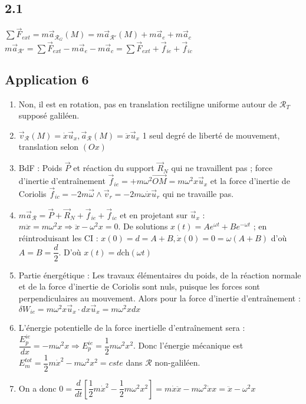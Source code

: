\documentclass[a4paper,12pt]{book}
\begin{document}
\subsection{2.1}
$\sum \vec{F}_{ext} = m\vec{a}_{\mathcal{R}_G}(M) = m\vec{a}_{\mathcal{R}'}(M) + m\vec{a}_e + m\vec{a}_c$
\\ $m\vec{a}_{\mathcal{R}'} = \sum \vec{F}_{ext} - m\vec{a}_e - m\vec{a}_c = \sum \vec{F}_{ext} + \vec{f}_{ie} + \vec{f}_{ic}$
 
\subsection{Application 6}
\begin{enumerate}
\item Non, il est en rotation, pas en translation rectiligne uniforme autour de $\mathcal{R}_T$ supposé galiléen.
\item $\vec{v}_\mathcal{R}(M) = \dot{x}\vec{u}_x, \vec{a}_\mathcal{R}(M) = \ddot{x}\vec{u}_x$ 1 seul degré de liberté de mouvement, translation selon $(Ox)$
\item BdF : Poids $\vec{P}$ et réaction du support $\vec{R}_N$ qui ne travaillent pas ; force d'inertie d'entraînement $\vec{f}_{ie} = +m\omega^2\vec{OM} = m\omega^2x\vec{u}_x$ et la force d'inertie de Coriolis $\vec{f}_{ic} = -2m\vec{\omega}\wedge\vec{v}_r = -2m\omega\dot{x}\vec{u}_r$ qui ne travaille pas.
\item $m\vec{a}_\mathcal{R} = \vec{P} +\vec{R}_N +\vec{f}_{ie} +\vec{f}_{ic}$ et en projetant sur $\vec{u}_x$ : $m\ddot{x} = m\omega^2 x \Rightarrow \ddot{x} -\omega^2 x=0$. De solutions $x(t) = Ae^{\omega t} + Be^{-\omega t}$ ; en réintroduisant les CI : $x(0) = d = A+B,\dot{x}(0) = 0= \omega(A+B)$ d'où $A=B=\dfrac{d}{2}$. D'où $x(t) = d\mathrm{ch}(\omega t)$
\item Partie énergétique : Les travaux élémentaires du poids, de la réaction normale et de la force d'inertie de Coriolis sont nuls, puisque les forces sont perpendiculaires au mouvement. Alors pour la force d'inertie d'entraînement : $\delta W_{ie} = m\omega^2 x\vec{u}_{x}\cdot dx\vec{u}_x = m\omega^2xdx$
\item L'énergie potentielle de la force inertielle d'entraînement sera : $\dfrac{E_p^{ie}}{dx} = -m\omega^2x \Rightarrow E_p^{ie} = \dfrac{1}{2}m\omega^2x^2$. Donc l'énergie mécanique est $E_m^{tot} = \dfrac{1}{2}m\dot{x}^2 -m\omega^2x^2 = cste$ dans $\mathcal{R}$ non-galiléen.
\item On a donc $0 = \dfrac{d}{dt}\left[\dfrac{1}{2}m\dot{x}^2 -\dfrac{1}{2}m\omega^2x^2\right] = m\dot{x}\ddot{x} - m\omega^2\dot{x}x = \ddot{x} - \omega^2x$
\end{enumerate}
\end{document}
